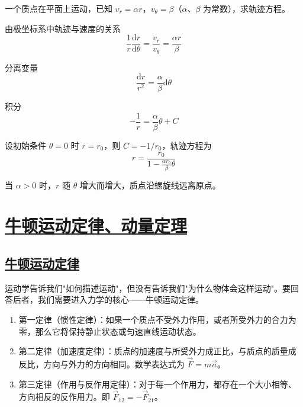\begin{example}[极坐标中的轨迹]
    一个质点在平面上运动，已知 $v_r = \alpha r$，$v_\theta = \beta$（$\alpha$、$\beta$ 为常数），求轨迹方程。
    \begin{solution}
        由极坐标系中轨迹与速度的关系
        \begin{equation}
            \frac{1}{r}\frac{\mathrm{d}r}{\mathrm{d}\theta} = \frac{v_r}{v_\theta} = \frac{\alpha r}{\beta}
        \end{equation}
        
        分离变量
        \begin{equation}
            \frac{\mathrm{d}r}{r^2} = \frac{\alpha}{\beta}\mathrm{d}\theta
        \end{equation}
        
        积分
        \begin{equation}
            -\frac{1}{r} = \frac{\alpha}{\beta}\theta + C
        \end{equation}
        
        设初始条件 $\theta = 0$ 时 $r = r_0$，则 $C = -1/r_0$，轨迹方程为
        \begin{equation}
            r = \frac{r_0}{1 - \frac{\alpha r_0}{\beta}\theta}
        \end{equation}
        
        当 $\alpha > 0$ 时，$r$ 随 $\theta$ 增大而增大，质点沿螺旋线远离原点。
    \end{solution}
\end{example}


\newpage
\section{\protect\hyperlink{:}{牛顿运动定律、动量定理}}

\subsection{\protect\hyperlink{:}{牛顿运动定律}}

运动学告诉我们"如何描述运动"，但没有告诉我们"为什么物体会这样运动"。要回答后者，我们需要进入力学的核心——牛顿运动定律。

\begin{theorem}[牛顿运动定律]
    \begin{enumerate}
        \item 第一定律（惯性定律）：如果一个质点不受外力作用，或者所受外力的合力为零，那么它将保持静止状态或匀速直线运动状态。
        \item 第二定律（加速度定律）：质点的加速度与所受外力成正比，与质点的质量成反比，方向与外力的方向相同。数学表达式为 $\vec{F} = m\vec{a}$。
        \item 第三定律（作用与反作用定律）：对于每一个作用力，都存在一个大小相等、方向相反的反作用力。即 $\vec{F}_{12} = -\vec{F}_{21}$。
    \end{enumerate}
\end{theorem}

